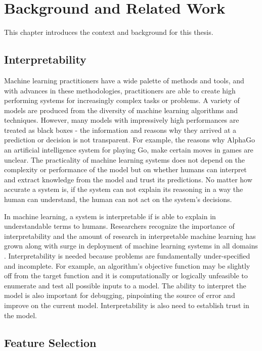 \chapter{Background and Related Work}
\indent This chapter introduces the context and background for this thesis.
\section{Interpretability}
\indent Machine learning practitioners have a wide palette of methods and tools, and with advances in these methodologies, practitioners are able to create high performing systems for increasingly complex tasks or problems. A variety of models are produced from the diversity of machine learning algorithms and techniques. However, many models with impressively high performances are treated as black boxes - the information and reasons why they arrived at a prediction or decision is not transparent. For example, the reasons why AlphaGo an artificial intelligence system for playing Go, make certain moves in games are unclear. The practicality of machine learning systems does not depend on the complexity or performance of the model but on whether humans can interpret and extract knowledge from the model and trust its predictions. No matter how accurate a system is, if the system can not explain its reasoning in a way the human can understand, the human can not act on the system’s decisions.

\indent In machine learning, a system is interpretable if is able to explain in understandable terms to humans. Researchers recognize the importance of interpretability and the amount of research in interpretable machine learning has grown along with surge in deployment of machine learning systems in all domains \cite{interpretableML}. Interpretability is needed because problems are fundamentally under-specified and incomplete. For example, an algorithm’s objective function may be slightly off from the target function and it is computationally or logically unfeasible to enumerate and test all possible inputs to a model. The ability to interpret the model is also important for debugging, pinpointing the source of error and improve on the current model. Interpretability is also need to establish trust in the model. 
\section{Feature Selection}
